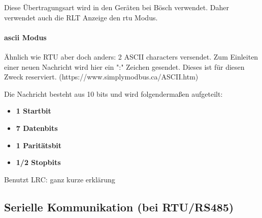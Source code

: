 Diese Übertragungsart wird in den Geräten bei Bösch verwendet. Daher verwendet auch die RLT Anzeige den \acs{rtu} Modus.

\paragraph{\acs{ascii} Modus}
Ähnlich wie RTU aber doch anders: 2 ASCII characters versendet.
Zum Einleiten einer neuen Nachricht wird hier ein ":" Zeichen gesendet. Dieses ist für diesen Zweck reserviert.
(https://www.simplymodbus.ca/ASCII.htm)

Die Nachricht besteht aus 10 bits und wird folgendermaßen aufgeteilt:
\begin{itemize}
	\item \textbf{1 Startbit}
	\item \textbf{7 Datenbits}
	\item \textbf{1 Paritätsbit}
	\item \textbf{1/2 Stopbits}
\end{itemize}

Benutzt LRC: ganz kurze erklärung

\subsection{Serielle Kommunikation (bei RTU/RS485)}



